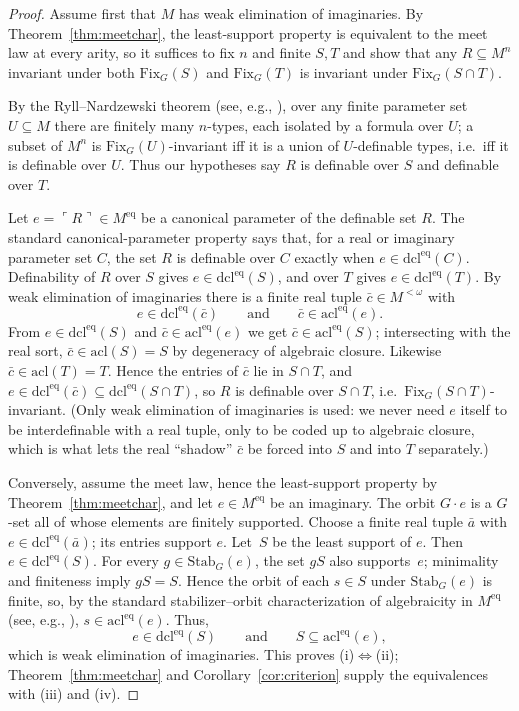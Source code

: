 \documentclass{lmcs}
\newcommand{\Fix}{\mathrm{Fix}}
\begin{document}
\begin{proof}
Assume first that $M$ has weak elimination of imaginaries. By
Theorem~\ref{thm:meetchar}, the least-support property is equivalent
to the meet law at every arity, so it suffices to fix $n$ and finite
$S,T$ and show that any $R\subseteq M^n$ invariant under both
$\Fix_G(S)$ and $\Fix_G(T)$ is invariant under $\Fix_G(S\cap T)$.

By the Ryll--Nardzewski theorem (see, e.g., \cite{Hodges93}), over any finite parameter set
$U\subseteq M$ there are finitely many $n$-types, each isolated by a
formula over $U$; a subset of $M^n$ is $\Fix_G(U)$-invariant iff it is
a union of $U$-definable types, i.e.\ iff it is definable over $U$.
Thus our hypotheses say $R$ is definable over $S$ and definable over
$T$.

Let $e=\ulcorner R\urcorner\in M^{\mathrm{eq}}$ be a canonical
parameter of the definable set $R$. The standard canonical-parameter
property says that, for a real or imaginary parameter set $C$, the set
$R$ is definable over $C$ exactly when
$e\in\mathrm{dcl}^{\mathrm{eq}}(C)$.
Definability of $R$ over $S$ gives
$e\in\mathrm{dcl}^{\mathrm{eq}}(S)$, and over $T$ gives
$e\in\mathrm{dcl}^{\mathrm{eq}}(T)$. By weak elimination of
imaginaries there is a finite real tuple
$\bar c\in M^{<\omega}$ with
\[
e\in\mathrm{dcl}^{\mathrm{eq}}(\bar c)
\qquad\text{and}\qquad
\bar c\in\mathrm{acl}^{\mathrm{eq}}(e).
\]
From $e\in\mathrm{dcl}^{\mathrm{eq}}(S)$ and
$\bar c\in\mathrm{acl}^{\mathrm{eq}}(e)$ we get
$\bar c\in\mathrm{acl}^{\mathrm{eq}}(S)$; intersecting with the real
sort, $\bar c\in\mathrm{acl}(S)=S$ by degeneracy of algebraic closure.
Likewise $\bar c\in\mathrm{acl}(T)=T$. Hence the entries of $\bar c$
lie in $S\cap T$, and $e\in\mathrm{dcl}^{\mathrm{eq}}(\bar c)
\subseteq\mathrm{dcl}^{\mathrm{eq}}(S\cap T)$, so $R$ is definable
over $S\cap T$, i.e.\ $\Fix_G(S\cap T)$-invariant. (Only weak
elimination of imaginaries is used: we never need $e$ itself to be
interdefinable with a real tuple, only to be coded up to algebraic
closure, which is what lets the real ``shadow'' $\bar c$ be
forced into $S$ and into $T$ separately.)

Conversely, assume the meet law, hence the least-support property by
Theorem~\ref{thm:meetchar}, and let $e\in M^{\mathrm{eq}}$ be an
imaginary. The orbit $G\cdot e$ is a $G$-set all of whose elements
are finitely supported. Choose a finite real tuple
$\bar a$ with $e\in\mathrm{dcl}^{\mathrm{eq}}(\bar a)$; its entries
support $e$. Let~$S$ be the least support of $e$. Then
$e\in\mathrm{dcl}^{\mathrm{eq}}(S)$. For every
$g\in\mathrm{Stab}_G(e)$, the set $gS$ also supports~$e$; minimality
and finiteness imply $gS=S$. Hence the orbit of each $s\in S$ under
$\mathrm{Stab}_G(e)$ is finite, so, by the standard
stabilizer--orbit characterization of algebraicity in $M^{\mathrm{eq}}$
(see, e.g., \cite{Hodges93}),
$s\in\mathrm{acl}^{\mathrm{eq}}(e)$. Thus,
\[
 e\in\mathrm{dcl}^{\mathrm{eq}}(S)
 \qquad\text{and}\qquad
 S\subseteq\mathrm{acl}^{\mathrm{eq}}(e),
\]
which is weak elimination of imaginaries. This proves
(i)$\Leftrightarrow$(ii); Theorem~\ref{thm:meetchar} and
Corollary~\ref{cor:criterion} supply the equivalences with (iii) and
(iv).
\end{proof}
\end{document}
